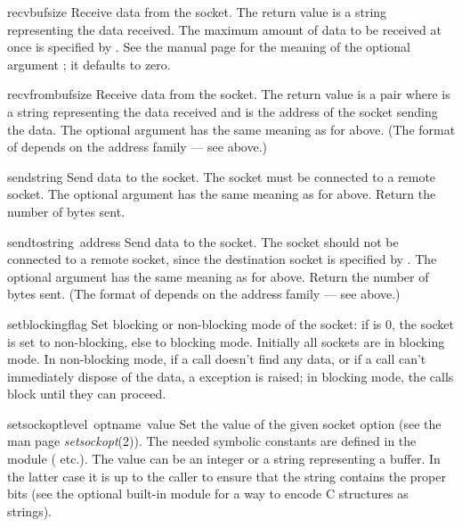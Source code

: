 \begin{funcdesc}{recv}{bufsize}
Receive data from the socket.  The return value is a string representing
the data received.  The maximum amount of data to be received
at once is specified by .  See the \UNIX{} manual page
for the meaning of the optional argument ; it defaults to
zero.
\end{funcdesc}

\begin{funcdesc}{recvfrom}{bufsize}
Receive data from the socket.  The return value is a pair
 where  is a string
representing the data received and  is the address of the
socket sending the data.  The optional  argument has the
same meaning as for  above.
(The format of  depends on the address family --- see above.)
\end{funcdesc}

\begin{funcdesc}{send}{string}
Send data to the socket.  The socket must be connected to a remote
socket.  The optional  argument has the same meaning as for
 above.  Return the number of bytes sent.
\end{funcdesc}

\begin{funcdesc}{sendto}{string\, address}
Send data to the socket.  The socket should not be connected to a
remote socket, since the destination socket is specified by
.  The optional  argument has the same
meaning as for  above.  Return the number of bytes sent.
(The format of  depends on the address family --- see above.)
\end{funcdesc}

\begin{funcdesc}{setblocking}{flag}
Set blocking or non-blocking mode of the socket: if  is 0,
the socket is set to non-blocking, else to blocking mode.  Initially
all sockets are in blocking mode.  In non-blocking mode, if a
 call doesn't find any data, or if a  call can't
immediately dispose of the data, a  exception is
raised; in blocking mode, the calls block until they can proceed.
\end{funcdesc}

\begin{funcdesc}{setsockopt}{level\, optname\, value}
Set the value of the given socket option (see the \UNIX{} man page
{\it setsockopt}(2)).  The needed symbolic constants are defined in
the  module ( etc.).  The value can be an
integer or a string representing a buffer.  In the latter case it is
up to the caller to ensure that the string contains the proper bits
(see the optional built-in module
 for a way to encode C structures as strings).
\end{funcdesc}

